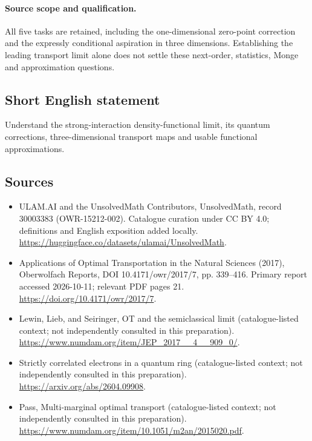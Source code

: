 \documentclass[11pt]{article}
\begin{document}
\paragraph{Source scope and qualification.}
All five tasks are retained, including the one-dimensional zero-point correction and the expressly conditional aspiration in three dimensions. Establishing the leading transport limit alone does not settle these next-order, statistics, Monge and approximation questions.
\subsection{Short English statement}
Understand the strong-interaction density-functional limit, its quantum corrections, three-dimensional transport maps and usable functional approximations.
\subsection{Sources}
\begin{itemize}
\item[\hypertarget{source:30003383:1}{S1}] ULAM.AI and the UnsolvedMath Contributors, UnsolvedMath, record 30003383 (OWR-15212-002). Catalogue curation under CC BY 4.0; definitions and English exposition added locally.
\url{https://huggingface.co/datasets/ulamai/UnsolvedMath}.
\item[\hypertarget{source:30003383:2}{S2}] Applications of Optimal Transportation in the Natural Sciences (2017), Oberwolfach Reports, DOI 10.4171/owr/2017/7, pp. 339--416. Primary report accessed 2026-10-11; relevant PDF pages 21.
\url{https://doi.org/10.4171/owr/2017/7}.
\item[\hypertarget{source:30003383:3}{S3}] Lewin, Lieb, and Seiringer, OT and the semiclassical limit (catalogue-listed context; not independently consulted in this preparation).
\url{https://www.numdam.org/item/JEP_2017__4__909_0/}.
\item[\hypertarget{source:30003383:4}{S4}] Strictly correlated electrons in a quantum ring (catalogue-listed context; not independently consulted in this preparation).
\url{https://arxiv.org/abs/2604.09908}.
\item[\hypertarget{source:30003383:5}{S5}] Pass, Multi-marginal optimal transport (catalogue-listed context; not independently consulted in this preparation).
\url{https://www.numdam.org/item/10.1051/m2an/2015020.pdf}.
\end{itemize}
\label{end:30003383}
\end{document}
